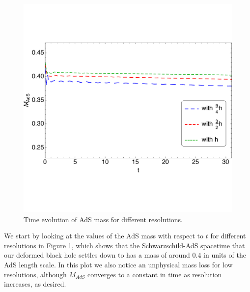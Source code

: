 \documentclass[a4paper,11pt]{article}
\begin{document}
\begin{figure}[!h]
        \centering
        \includegraphics[width=4.8in,clip=true]{plots/timeseries/AdSmass/fullplotfillregtAdSmassallres.pdf}
\parbox{5.0in}{\caption{Time evolution of AdS mass for different resolutions.
        }\label{fig:AdSmass-crop}}
\end{figure}

We start by looking at the values of the AdS mass with respect to $t$ for different resolutions in Figure \ref{fig:AdSmass-crop}, which shows that the Schwarzschild-AdS spacetime that our deformed black hole settles down to has a mass of around $0.4$ in units of the AdS length scale. In this plot we also notice an unphysical mass loss for low resolutions, although $M_{AdS}$ converges to a constant in time as resolution increases, as desired.

\end{document}
